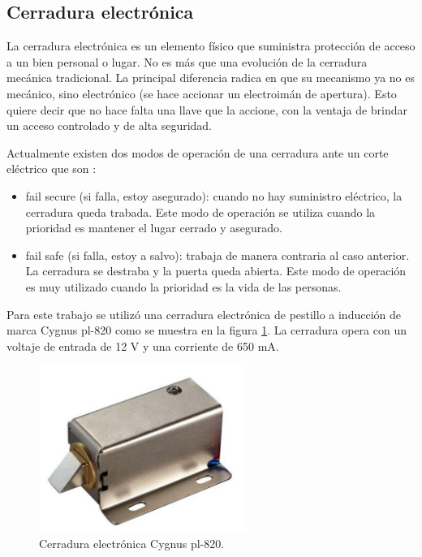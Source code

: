 \subsection{Cerradura electrónica}

La cerradura electrónica es un elemento físico que suministra protección de acceso a un bien personal o lugar. No es más que una evolución de la cerradura mecánica tradicional. La principal diferencia radica en que su mecanismo ya no es mecánico, sino electrónico (se hace accionar un electroimán de apertura). Esto quiere decir que no hace falta una llave que la accione, con la ventaja de brindar un acceso controlado y de alta seguridad.

\pagebreak
Actualmente existen dos modos de operación de una cerradura ante un corte eléctrico que son \citep{WEBSITE:trabajoCerradura}:

\begin{itemize}
\item fail secure (si falla, estoy asegurado): cuando no hay suministro eléctrico, la cerradura queda trabada. Este modo de operación se utiliza cuando la prioridad es mantener el lugar cerrado y asegurado.
\item fail safe (si falla, estoy a salvo): trabaja de manera contraria al caso anterior. La cerradura se destraba y la puerta queda abierta. Este modo de operación es muy utilizado cuando la prioridad es la vida de las personas.
\end{itemize}

Para este trabajo se utilizó una cerradura electrónica de pestillo a inducción de marca Cygnus pl-820 como se muestra en la figura \ref{fig:cerradura}. La  cerradura opera con un voltaje de entrada de 12 V y una corriente de 650 mA.

\begin{figure}[ht]
	\centering
	\includegraphics[width=0.6\textwidth]{./Figures/cerradura.png}
	\caption{Cerradura electrónica Cygnus pl-820.}
	\label{fig:cerradura}
\end{figure} 


